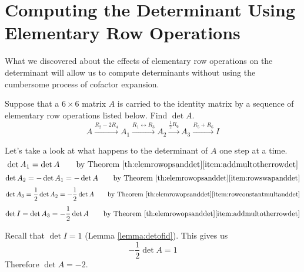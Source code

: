\documentclass{ximera}
\begin{document}
\section*{Computing the Determinant Using Elementary Row Operations}
What we discovered about the effects of elementary row operations on the determinant will allow us to compute determinants without using the cumbersome process of cofactor expansion.

\begin{example} Suppose that a $6\times 6$ matrix $A$ is carried to the identity matrix by a sequence of elementary row operations listed below.  Find $\det{A}$.
$$A\xrightarrow{R_2-2R_4}A_1\xrightarrow{R_1\leftrightarrow R_3}A_2\xrightarrow{\frac{1}{2}R_6}A_3\xrightarrow{R_5+R_6}I$$
\begin{explanation}
Let's take a look at what happens to the determinant of $A$ one step at a time.  
$$\det{A_1}=\det{A}\quad\quad \text{by Theorem \ref{th:elemrowopsanddet}\ref{item:addmultotherrowdet}}$$
$$\det{A_2}=-\det{A_1}=-\det{A}\quad\quad \text{by Theorem \ref{th:elemrowopsanddet}\ref{item:rowswapanddet}}$$
$$\det{A_3}=\frac{1}{2}\det{A_2}=-\frac{1}{2}\det{A}\quad\quad \text{by Theorem \ref{th:elemrowopsanddet}\ref{item:rowconstantmultanddet}}$$
$$\det{I}=\det{A_3}=-\frac{1}{2}\det{A}\quad\quad \text{by Theorem \ref{th:elemrowopsanddet}\ref{item:addmultotherrowdet}}$$

Recall that $\det{I}=1$ (Lemma \ref{lemma:detofid}).  This gives us
$$-\frac{1}{2}\det{A}=1$$
Therefore $\det{A}=-2$.

\end{explanation}
\end{example}
\end{document}

